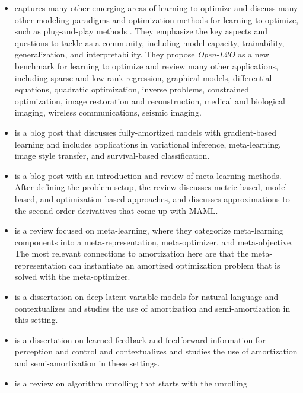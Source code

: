 \begin{itemize}
\item \citet{chen2021learning} captures many other emerging areas
  of learning to optimize and discuss many other modeling paradigms
  and optimization methods for learning to optimize, such as
  plug-and-play methods \citep{venkatakrishnan2013plug,meinhardt2017learning,rick2017one,zhang2017learning}.
  They emphasize the key aspects and questions to tackle as a community,
  including model capacity, trainability, generalization, and
  interpretability.
  They propose \emph{Open-L2O} as a new benchmark for
  learning to optimize and review many other applications,
  including sparse and low-rank regression, graphical models,
  differential equations, quadratic optimization, inverse problems,
  constrained optimization, image restoration and reconstruction,
  medical and biological imaging, wireless communications,
  seismic imaging.
\item \citet{shu2017amortized} is a blog post that discusses
  fully-amortized models with gradient-based learning
  and includes applications in variational inference,
  meta-learning, image style transfer,
  and survival-based classification.
\item \citet{weng2018metalearning} is a blog post
  with an introduction and review of meta-learning methods.
  After defining the problem setup, the review discusses
  metric-based, model-based, and optimization-based approaches,
  and discusses approximations to the second-order derivatives
  that come up with MAML.
\item \citet{hospedales2020meta} is a review focused on meta-learning,
  where they categorize meta-learning components into a
  meta-representation, meta-optimizer, and meta-objective.
  The most relevant connections to amortization here are that
  the meta-representation can instantiate an
  amortized optimization problem that is solved with the
  meta-optimizer.
\item \citet{kim2020deep} is a dissertation on deep
  latent variable models for natural language
  and contextualizes and studies the use of amortization and
  semi-amortization in this setting.
\item \citet{marino2021learned} is a dissertation on learned
  feedback and feedforward information for perception and control
  and contextualizes and studies the use of amortization and
  semi-amortization in these settings.
\item \citet{monga2021algorithm} is a review on
  algorithm unrolling that starts with the unrolling

\end{itemize}
